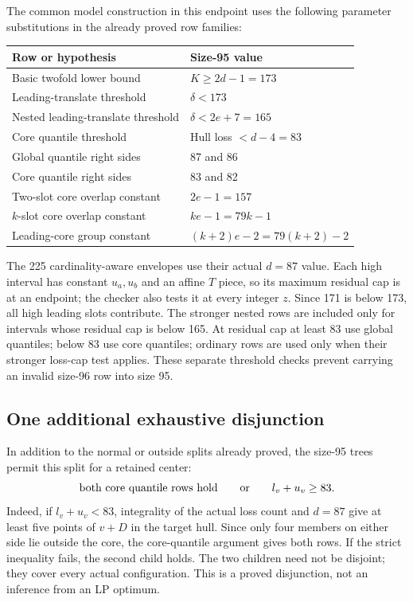 \documentclass[11pt,a4paper]{article}
\theoremstyle{remark}
\begin{document}
The common model construction in this endpoint uses the following
parameter substitutions in the already proved row families:
\begin{center}\small
\begin{tabular}{ll}
\toprule
Row or hypothesis&Size-95 value\\\midrule
Basic twofold lower bound&$K\ge2d-1=173$\\
Leading-translate threshold&$\delta<173$\\
Nested leading-translate threshold&$\delta<2e+7=165$\\
Core quantile threshold&Hull loss $<d-4=83$\\
Global quantile right sides&87 and 86\\
Core quantile right sides&83 and 82\\
Two-slot core overlap constant&$2e-1=157$\\
$k$-slot core overlap constant&$ke-1=79k-1$\\
Leading-core group constant&$(k+2)e-2=79(k+2)-2$\\\bottomrule
\end{tabular}
\end{center}
The 225 cardinality-aware envelopes use their actual $d=87$ value.
Each high interval has constant $u_a,u_b$ and an affine $T$ piece, so
its maximum residual cap is at an endpoint; the checker also tests it
at every integer $z$. Since 171 is below 173, all high leading slots
contribute. The stronger nested rows are included only for intervals
whose residual cap is below 165. At residual cap at least 83 use global
quantiles; below 83 use core quantiles; ordinary rows are used only
when their stronger loss-cap test applies. These separate threshold
checks prevent carrying an invalid size-96 row into size 95.

\subsection{One additional exhaustive disjunction}
In addition to the normal or outside splits already proved, the
size-95 trees permit this split for a retained center:
\[
 \text{both core quantile rows hold}\qquad\hbox{or}\qquad
 l_v+u_v\ge83.
\]
Indeed, if $l_v+u_v<83$, integrality of the actual loss count and $d=87$
give at least five points of $v+D$ in the target hull. Since only four
members on either side lie outside the core, the core-quantile
argument gives both rows. If the strict inequality fails, the second
child holds. The two children need not be disjoint; they cover every
actual configuration. This is a proved disjunction, not an inference
from an LP optimum.
\end{document}
